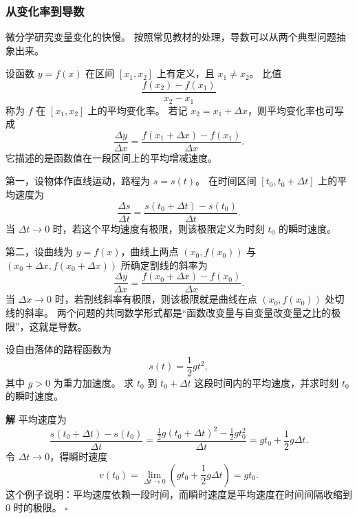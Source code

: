 \documentclass[fontset=fandol]{ctexart}
\newenvironment{solution}{\par\noindent\textbf{解}\quad}{\hfill$\square$\par\vspace{0.8em}}
\begin{document}
\subsubsection*{从变化率到导数}

微分学研究变量变化的快慢。 按照常见教材的处理，导数可以从两个典型问题抽象出来。

\begin{definition}[平均变化率]
设函数 $y=f(x)$ 在区间 $[x_1,x_2]$ 上有定义，且 $x_1\neq x_2$。 比值
\[
\frac{f(x_2)-f(x_1)}{x_2-x_1}
\]
称为 $f$ 在 $[x_1,x_2]$ 上的平均变化率。 若记 $x_2=x_1+\Delta x$，则平均变化率也可写成
\[
\frac{\Delta y}{\Delta x}
=\frac{f(x_1+\Delta x)-f(x_1)}{\Delta x}.
\]
它描述的是函数值在一段区间上的平均增减速度。
\end{definition}

第一，设物体作直线运动，路程为 $s=s(t)$。 在时间区间 $[t_0,t_0+\Delta t]$ 上的平均速度为
\[
\frac{\Delta s}{\Delta t}
=\frac{s(t_0+\Delta t)-s(t_0)}{\Delta t}.
\]
当 $\Delta t\to0$ 时，若这个平均速度有极限，则该极限定义为时刻 $t_0$ 的瞬时速度。

第二，设曲线为 $y=f(x)$，曲线上两点 $(x_0,f(x_0))$ 与 $(x_0+\Delta x,f(x_0+\Delta x))$ 所确定割线的斜率为
\[
\frac{\Delta y}{\Delta x}
=\frac{f(x_0+\Delta x)-f(x_0)}{\Delta x}.
\]
当 $\Delta x\to0$ 时，若割线斜率有极限，则该极限就是曲线在点 $(x_0,f(x_0))$ 处切线的斜率。 两个问题的共同数学形式都是“函数改变量与自变量改变量之比的极限”，这就是导数。

\begin{center}
\end{center}

\begin{example}[平均速度与瞬时速度]
设自由落体的路程函数为
\[
s(t)=\frac12gt^2,
\]
其中 $g>0$ 为重力加速度。 求 $t_0$ 到 $t_0+\Delta t$ 这段时间内的平均速度，并求时刻 $t_0$ 的瞬时速度。
\end{example}
\begin{solution}
平均速度为
\[
\frac{s(t_0+\Delta t)-s(t_0)}{\Delta t}
=\frac{\frac12g(t_0+\Delta t)^2-\frac12gt_0^2}{\Delta t}
=gt_0+\frac12g\Delta t.
\]
令 $\Delta t\to0$，得瞬时速度
\[
v(t_0)=\lim_{\Delta t\to0}\left(gt_0+\frac12g\Delta t\right)=gt_0.
\]
这个例子说明：平均速度依赖一段时间，而瞬时速度是平均速度在时间间隔收缩到 $0$ 时的极限。
\end{solution}
\end{document}
